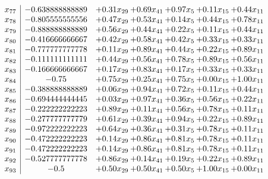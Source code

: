 \documentclass[8pt]{article}
\begin{document}
\[\begin{array}{c| c c@{\hskip 2pt} c@{\hskip 2pt} c@{\hskip 2pt} c@{\hskip 2pt} c@{\hskip 2pt} }
 x_{77}   &  -0.638888888889 & +  0.31 x_{29} & +  0.69 x_{41} & +  0.97 x_{5} & +  0.11 x_{15} & +  0.44 x_{11}\\
 x_{78}   &  -0.805555555556 & +  0.47 x_{29} & +  0.53 x_{41} & +  0.14 x_{5} & +  0.44 x_{15} & +  0.78 x_{11}\\
 x_{79}   &  -0.888888888889 & +  0.56 x_{29} & +  0.44 x_{41} & +  0.22 x_{5} & +  0.11 x_{15} & +  0.44 x_{11}\\
 x_{80}   &  -0.416666666667 & +  0.42 x_{29} & +  0.58 x_{41} & +  0.42 x_{5} & +  0.33 x_{15} & +  0.33 x_{11}\\
 x_{81}   &  -0.777777777778 & +  0.11 x_{29} & +  0.89 x_{41} & +  0.44 x_{5} & +  0.22 x_{15} & +  0.89 x_{11}\\
 x_{82}   &  -0.111111111111 & +  0.44 x_{29} & +  0.56 x_{41} & +  0.78 x_{5} & +  0.89 x_{15} & +  0.56 x_{11}\\
 x_{83}   &  -0.166666666667 & +  0.17 x_{29} & +  0.83 x_{41} & +  0.17 x_{5} & +  0.33 x_{15} & +  0.33 x_{11}\\
 x_{84}   &  -0.75 & +  0.75 x_{29} & +  0.25 x_{41} & +  0.75 x_{5} & +  0.00 x_{15} & +  1.00 x_{11}\\
 x_{85}   &  -0.388888888889 & +  0.06 x_{29} & +  0.94 x_{41} & +  0.72 x_{5} & +  0.11 x_{15} & +  0.44 x_{11}\\
 x_{86}   &  -0.694444444445 & +  0.03 x_{29} & +  0.97 x_{41} & +  0.36 x_{5} & +  0.56 x_{15} & +  0.22 x_{11}\\
 x_{87}   &  -0.222222222223 & +  0.89 x_{29} & +  0.11 x_{41} & +  0.56 x_{5} & +  0.78 x_{15} & +  0.11 x_{11}\\
 x_{88}   &  -0.277777777779 & +  0.61 x_{29} & +  0.39 x_{41} & +  0.94 x_{5} & +  0.22 x_{15} & +  0.89 x_{11}\\
 x_{89}   &  -0.972222222223 & +  0.64 x_{29} & +  0.36 x_{41} & +  0.31 x_{5} & +  0.78 x_{15} & +  0.11 x_{11}\\
 x_{90}   &  -0.472222222223 & +  0.14 x_{29} & +  0.86 x_{41} & +  0.81 x_{5} & +  0.78 x_{15} & +  0.11 x_{11}\\
 x_{91}   &  -0.472222222223 & +  0.14 x_{29} & +  0.86 x_{41} & +  0.81 x_{5} & +  0.78 x_{15} & +  0.11 x_{11}\\
 x_{92}   &  -0.527777777778 & +  0.86 x_{29} & +  0.14 x_{41} & +  0.19 x_{5} & +  0.22 x_{15} & +  0.89 x_{11}\\
 x_{93}   &  -0.5 & +  0.50 x_{29} & +  0.50 x_{41} & +  0.50 x_{5} & +  1.00 x_{15} & +  0.00 x_{11}\\

\end{array}\]
\end{document}
